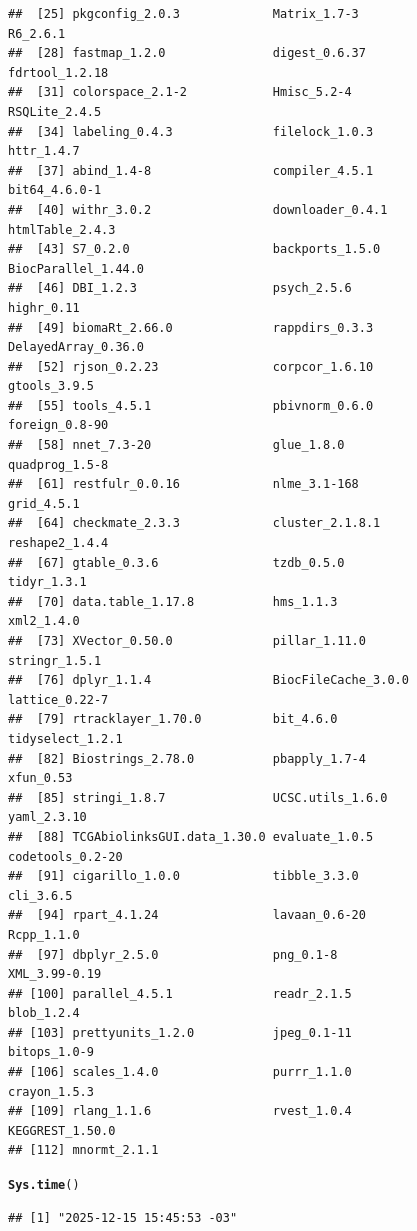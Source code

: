 \documentclass{article}\usepackage[]{graphicx}\usepackage[]{xcolor}
\makeatletter
\newcommand{\hldef}[1]{\textcolor[rgb]{0.345,0.345,0.345}{#1}}%
\newcommand{\hlkwd}[1]{\textcolor[rgb]{0.737,0.353,0.396}{\textbf{#1}}}%
\newenvironment{kframe}{%
 \def\at@end@of@kframe{}%
 \ifinner\ifhmode%
  \def\at@end@of@kframe{\end{minipage}}%
  \begin{minipage}{\columnwidth}%
 \fi\fi%
 \def\FrameCommand##1{\hskip\@totalleftmargin \hskip-\fboxsep
 \colorbox{shadecolor}{##1}\hskip-\fboxsep
     \hskip-\linewidth \hskip-\@totalleftmargin \hskip\columnwidth}%
 \MakeFramed {\advance\hsize-\width
   \@totalleftmargin\z@ \linewidth\hsize
   \@setminipage}}%
 {\par\unskip\endMakeFramed%
 \at@end@of@kframe}
\newenvironment{knitrout}{}{} %
\makeatother
\begin{document}
\begin{knitrout}
\begin{kframe}
\begin{verbatim}
##  [25] pkgconfig_2.0.3             Matrix_1.7-3                R6_2.6.1                   
##  [28] fastmap_1.2.0               digest_0.6.37               fdrtool_1.2.18             
##  [31] colorspace_2.1-2            Hmisc_5.2-4                 RSQLite_2.4.5              
##  [34] labeling_0.4.3              filelock_1.0.3              httr_1.4.7                 
##  [37] abind_1.4-8                 compiler_4.5.1              bit64_4.6.0-1              
##  [40] withr_3.0.2                 downloader_0.4.1            htmlTable_2.4.3            
##  [43] S7_0.2.0                    backports_1.5.0             BiocParallel_1.44.0        
##  [46] DBI_1.2.3                   psych_2.5.6                 highr_0.11                 
##  [49] biomaRt_2.66.0              rappdirs_0.3.3              DelayedArray_0.36.0        
##  [52] rjson_0.2.23                corpcor_1.6.10              gtools_3.9.5               
##  [55] tools_4.5.1                 pbivnorm_0.6.0              foreign_0.8-90             
##  [58] nnet_7.3-20                 glue_1.8.0                  quadprog_1.5-8             
##  [61] restfulr_0.0.16             nlme_3.1-168                grid_4.5.1                 
##  [64] checkmate_2.3.3             cluster_2.1.8.1             reshape2_1.4.4             
##  [67] gtable_0.3.6                tzdb_0.5.0                  tidyr_1.3.1                
##  [70] data.table_1.17.8           hms_1.1.3                   xml2_1.4.0                 
##  [73] XVector_0.50.0              pillar_1.11.0               stringr_1.5.1              
##  [76] dplyr_1.1.4                 BiocFileCache_3.0.0         lattice_0.22-7             
##  [79] rtracklayer_1.70.0          bit_4.6.0                   tidyselect_1.2.1           
##  [82] Biostrings_2.78.0           pbapply_1.7-4               xfun_0.53                  
##  [85] stringi_1.8.7               UCSC.utils_1.6.0            yaml_2.3.10                
##  [88] TCGAbiolinksGUI.data_1.30.0 evaluate_1.0.5              codetools_0.2-20           
##  [91] cigarillo_1.0.0             tibble_3.3.0                cli_3.6.5                  
##  [94] rpart_4.1.24                lavaan_0.6-20               Rcpp_1.1.0                 
##  [97] dbplyr_2.5.0                png_0.1-8                   XML_3.99-0.19              
## [100] parallel_4.5.1              readr_2.1.5                 blob_1.2.4                 
## [103] prettyunits_1.2.0           jpeg_0.1-11                 bitops_1.0-9               
## [106] scales_1.4.0                purrr_1.1.0                 crayon_1.5.3               
## [109] rlang_1.1.6                 rvest_1.0.4                 KEGGREST_1.50.0            
## [112] mnormt_2.1.1
\end{verbatim}
\begin{alltt}
\hlkwd{Sys.time}\hldef{()}
\end{alltt}
\begin{verbatim}
## [1] "2025-12-15 15:45:53 -03"
\end{verbatim}
\end{kframe}
\end{knitrout}
\end{document}
